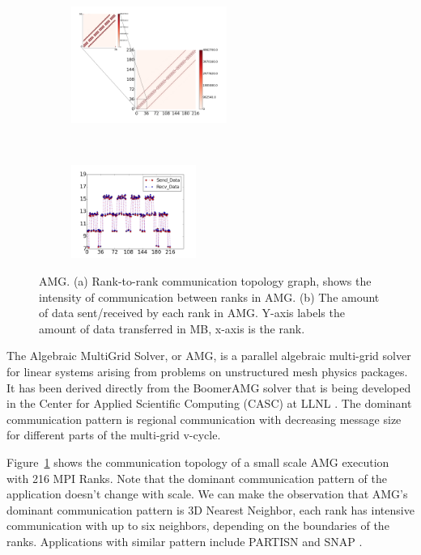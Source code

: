 \documentclass[conference]{IEEEtran}
\begin{document}
\begin{figure}[t!]
    \centering
    \begin{subfigure}[t]{0.25\textwidth}
        \centering
        \includegraphics[height=1.5in]{figs/appstudy/amg/amg_pip}
        \caption{}
        \label{fig:amg-communication-topology}
    \end{subfigure}%
    ~
    \begin{subfigure}[t]{0.24\textwidth}
        \centering
        \includegraphics[height=1.2in]{figs/appstudy/amg/amg_data_transfer}
        \caption{}
        \label{fig:amg-data-trans}
    \end{subfigure}
    \caption{AMG. (a) Rank-to-rank communication topology graph, shows the intensity of communication between ranks in AMG. (b) The amount of data sent/received by each rank in AMG. Y-axis labels the amount of data transferred in MB, x-axis is the rank. }
\end{figure}

The Algebraic MultiGrid Solver, or AMG, is a parallel algebraic multi-grid solver for linear systems arising from problems on unstructured mesh physics packages. It has been derived directly from the BoomerAMG solver that is being developed in the Center for Applied Scientific Computing (CASC) at LLNL \cite{amg}. The dominant communication pattern is regional communication with decreasing message size for different parts of the multi-grid v-cycle.

Figure~\ref{fig:amg-communication-topology} shows the communication topology of a small scale AMG execution with 216 MPI Ranks. Note that the dominant communication pattern of the application doesn't change with scale. We can make the observation that AMG's dominant communication pattern is 3D Nearest Neighbor, each rank has intensive communication with up to six neighbors, depending on the boundaries of the ranks. Applications with similar pattern include PARTISN \cite{partisn} and SNAP \cite{snap}.
\end{document}
